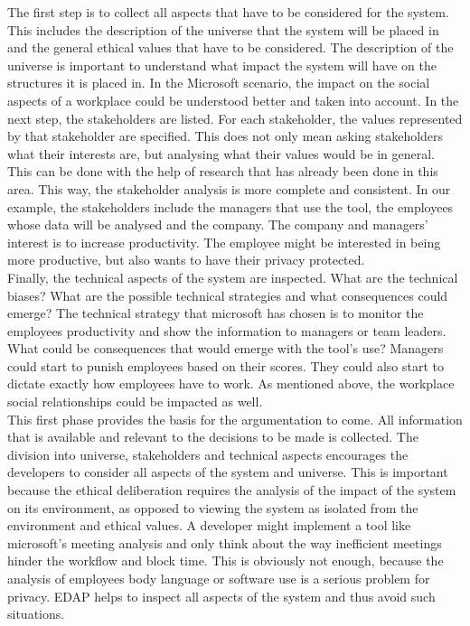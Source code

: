 The first step is to collect all aspects that have to be considered for the system. This includes the description of the universe that the system will be placed in and the general ethical values that have to be considered. The description of the universe is important to understand what impact the system will have on the structures it is placed in. In the Microsoft scenario, the impact on the social aspects of a workplace could be understood better and taken into account. In the next step, the stakeholders are listed. For each stakeholder, the values represented by that stakeholder are specified. This does not only mean asking stakeholders what their interests are, but analysing what their values would be in general. This can be done with the help of research that has already been done in this area. This way, the stakeholder analysis is more complete and consistent. In our example, the stakeholders include the managers that use the tool, the employees whose data will be analysed and the company. The company and managers' interest is to increase productivity. The employee might be interested in being more productive, but also wants to have their privacy protected.\\
 Finally, the technical aspects of the system are inspected. What are the technical biases? What are the possible technical strategies and what consequences could emerge? The technical strategy that microsoft has chosen is to monitor the employees productivity and show the information to managers or team leaders. What could be consequences that would emerge with the tool’s use? Managers could start to punish employees based on their scores. They could also start to dictate exactly how employees have to work. As mentioned above, the workplace social relationships could be impacted as well. \\
This first phase provides the basis for the argumentation to come. All information that is available and relevant to the decisions to be made is collected. The division into universe, stakeholders and technical aspects encourages the developers to consider all aspects of the system and universe. This is important because the ethical deliberation requires the analysis of the impact of the system on its environment, as opposed to viewing the system as isolated from the environment and ethical values. A developer might implement a tool like microsoft's meeting analysis and only think about the way inefficient meetings hinder the workflow and block time. This is obviously not enough, because the analysis of employees body language or software use is a serious problem for privacy. EDAP helps to inspect all aspects of the system and thus avoid such situations.\\
